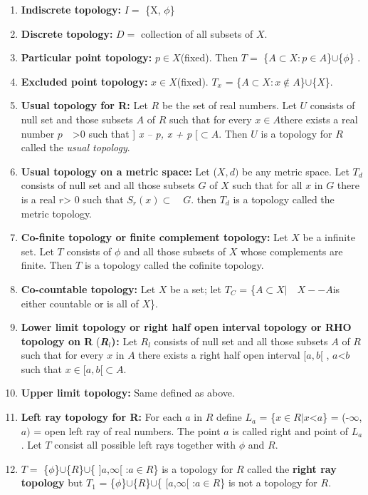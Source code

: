 \documentclass[12pt]{amsart}
\begin{document}
\begin{enumerate}
\item \textbf{Indiscrete topology:} $I =$ {\{}X, $\phi ${\}}
\item \textbf{Discrete topology:} $D =$ collection of all subsets of $X$.
\item \textbf{Particular point topology:} $p\in X $(fixed). Then $T =$ {\{}$A\subset X : p\in A${\}}$\cup ${\{}$\phi ${\}} .
\item \textbf{Excluded point topology:} $x\in X $(fixed). $T_{x}$ = {\{}$A\subset X: x\notin A${\}}$\cup ${\{}$X${\}}.
\item \textbf{Usual topology for R:} Let $R$ be the set of real numbers. Let $U$ consists of null set and those subsets $A$ of $R$ such that for every $x \in A $there exists a real number $p \quad $>$ 0$ such that ] \textit{x -- p, x + p }[$\subset A$. Then $U$ is a topology for $R$ called the \textit{usual topology}.
\item \textbf{Usual topology on a metric space:} Let ($X, d)$ be any metric space. Let $T_{d}$ consists of null set and all those subsets $G$ of $X$ such that for all $x$ in $G$ there is a real $r $> 0 such that $S_{r}(x)\subset  \quad G$. then $T_{d}$ is a topology called the metric topology.
\item \textbf{Co-finite topology or finite complement topology:} Let $X$ be a infinite set. Let $T$ consists of $\phi $ and all those subsets of $X$ whose complements are finite. Then $T$ is a topology called the cofinite topology.
\item \textbf{Co-countable topology:} Let $X$ be a set; let $T_{C}$ = {\{}$A\subset X\vert  \quad X -- A $is either countable or is all of $X${\}}.
\item \textbf{Lower limit topology or right half open interval topology or RHO topology on R} (\textbf{\textit{R}}$_{l}$\textbf{)}$_{ }$\textbf{:} Let $R_{l}$ consists of null set and all those subsets $A$ of $R$ such that for every $x$ in $A$ there exists a right half open interval [$a, b$[ , $a $<$ b $such that $x\in $[$a, b$[$\subset A$.
\item \textbf{Upper limit topology:} Same defined as above.
\item \textbf{Left ray topology for R:} For each $a$ in $R$ define $L_{a}$ = {\{}$x\in R\vert x $<$ a${\}} = (-$\infty $, $a)$ = open left ray of real numbers. The point $a$ is called right and point of $L_{a}$. Let $T$ consist all possible left rays together with $\phi $ and $R$.
\item $T =$ {\{}$\phi ${\}}$\cup ${\{}$R${\}}$\cup ${\{} ]$a$,$\infty $[ :$a\in R${\}} is a topology for $R$ called the \textbf{right ray topology} but $T_{1}$ = {\{}$\phi ${\}}$\cup ${\{}$R${\}}$\cup ${\{} [$a$,$\infty $[ :$a\in R${\}} is not a topology for $R$.

\end{enumerate}
\end{document}
